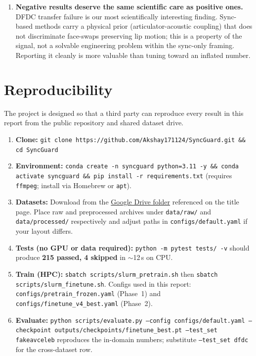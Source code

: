 \documentclass[12pt, letterpaper]{article}
\begin{document}
\begin{enumerate}[leftmargin=1.5em, itemsep=4pt]
    \item \textbf{Negative results deserve the same scientific care as positive ones.} DFDC transfer failure is our most scientifically interesting finding. Sync-based methods carry a physical prior (articulator-acoustic coupling) that does not discriminate face-swaps preserving lip motion; this is a property of the signal, not a solvable engineering problem within the sync-only framing. Reporting it cleanly is more valuable than tuning toward an inflated number.
\end{enumerate}

\section{Reproducibility}

The project is designed so that a third party can reproduce every result in this report from the public repository and shared dataset drive.

\begin{enumerate}[leftmargin=1.5em, itemsep=3pt]
    \item \textbf{Clone:} \texttt{git clone https://github.com/Akshay171124/SyncGuard.git \&\& cd SyncGuard}
    \item \textbf{Environment:} \texttt{conda create -n syncguard python=3.11 -y \&\& conda activate syncguard \&\& pip install -r requirements.txt} (requires \texttt{ffmpeg}; install via Homebrew or \texttt{apt}).
    \item \textbf{Datasets:} Download from the \href{https://drive.google.com/drive/folders/1wQ9cdWo5R9O8ZvwPO7XUnfMvVOgoIF1E}{Google Drive folder} referenced on the title page. Place raw and preprocessed archives under \texttt{data/raw/} and \texttt{data/processed/} respectively and adjust paths in \texttt{configs/default.yaml} if your layout differs.
    \item \textbf{Tests (no GPU or data required):} \texttt{python -m pytest tests/ -v} should produce \textbf{215 passed, 4 skipped} in $\sim$12\,s on CPU.
    \item \textbf{Train (HPC):} \texttt{sbatch scripts/slurm\_pretrain.sh} then \texttt{sbatch scripts/slurm\_finetune.sh}. Configs used in this report: \texttt{configs/pretrain\_frozen.yaml} (Phase~1) and \texttt{configs/finetune\_v4\_best.yaml} (Phase~2).
    \item \textbf{Evaluate:} \texttt{python scripts/evaluate.py --config configs/default.yaml --checkpoint outputs/checkpoints/finetune\_best.pt --test\_set fakeavceleb} reproduces the in-domain numbers; substitute \texttt{--test\_set dfdc} for the cross-dataset row.
\end{enumerate}
\end{document}
